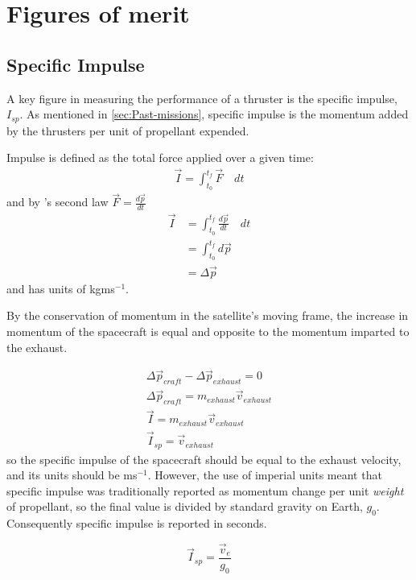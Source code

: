 \section{Figures of merit}
\subsection{Specific Impulse} \label{sub:Isp}

A key figure in measuring the performance of a thruster is the specific impulse, $I_{sp}$. As mentioned in \autoref{sec:Past-missions}, specific impulse is the momentum added by the thrusters per unit of propellant expended.

Impulse is defined as the total force applied over a given time:
\begin{gather}
\vec{I} = \int_{t_0}^{t_f}\vec{F}\quad dt
\end{gather}
and by \textcite{Newton1687}'s second law $\vec{F} = \frac{d\vec{p}}{dt}$
\begin{align}
\vec{I} &= \int_{t_0}^{t_f}\frac{d\vec{p}}{dt}\quad dt \\
&= \int_{t_0}^{t_f}d\vec{p} \\
&= \Delta\vec{p}
\end{align}
and has units of kgms$^{-1}$. 

By the conservation of momentum in the satellite's moving frame, the increase in momentum of the spacecraft is equal and opposite to the momentum imparted to the exhaust.

\begin{gather}
\Delta\vec{p}_{craft} - \Delta\vec{p}_{exhaust} = 0 \\
\Delta\vec{p}_{craft} = m_{exhaust}\vec{v}_{exhaust} \\
\vec{I} = m_{exhaust}\vec{v}_{exhaust} \\
\vec{I}_{sp} = \vec{v}_{exhaust}
\end{gather}
so the specific impulse of the spacecraft should be equal to the exhaust velocity, and its units should be ms$^{-1}$. However, the use of imperial units meant that specific impulse was traditionally reported as momentum change per unit {\em weight} of propellant, so the final value is divided by standard gravity on Earth, $g_0$. Consequently specific impulse is reported in seconds.

\begin{equation}
\vec{I}_{sp}=\frac{\vec{v}_e}{g_0}
\end{equation}

